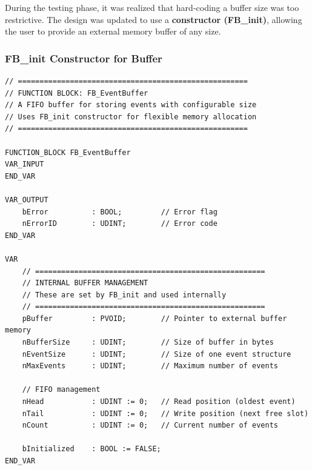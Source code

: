 \documentclass[11pt,a4paper]{article}
\begin{document}
During the testing phase, it was realized that hard-coding a buffer size was too restrictive. The design was updated to use a \textbf{constructor (FB\_init)}, allowing the user to provide an external memory buffer of any size.

\subsubsection*{FB\_init Constructor for Buffer}

\begin{lstlisting}
// =====================================================
// FUNCTION BLOCK: FB_EventBuffer
// A FIFO buffer for storing events with configurable size
// Uses FB_init constructor for flexible memory allocation
// =====================================================

FUNCTION_BLOCK FB_EventBuffer
VAR_INPUT
END_VAR

VAR_OUTPUT
    bError          : BOOL;         // Error flag
    nErrorID        : UDINT;        // Error code
END_VAR

VAR
    // =====================================================
    // INTERNAL BUFFER MANAGEMENT
    // These are set by FB_init and used internally
    // =====================================================
    pBuffer         : PVOID;        // Pointer to external buffer memory
    nBufferSize     : UDINT;        // Size of buffer in bytes
    nEventSize      : UDINT;        // Size of one event structure
    nMaxEvents      : UDINT;        // Maximum number of events
    
    // FIFO management
    nHead           : UDINT := 0;   // Read position (oldest event)
    nTail           : UDINT := 0;   // Write position (next free slot)
    nCount          : UDINT := 0;   // Current number of events
    
    bInitialized    : BOOL := FALSE;
END_VAR
\end{lstlisting}
\end{document}
